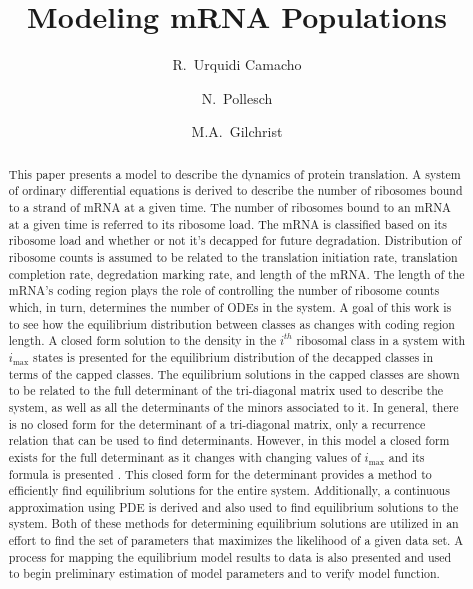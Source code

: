 \documentclass[review]{elsarticle}
\newcommand{\imax}{\ensuremath{i_{\max}}\xspace}
\begin{document}
\title{Modeling mRNA Populations}
\author[utkgst]{R.~Urquidi Camacho}
\author[utkm,curradd]{N.~Pollesch}
\author[utkgst,utkeeb,nimbios,cor1]{M.A.~Gilchrist}
\address[utkgst]{Genome Science and Technology Program, University of Tennessee, Knoxville, TN 37996-XXX}
\address[utkm]{Department of Mathematics, University of Tennessee,  Knoxville, TN 37996-1320}
\address[utkeeb]{Department of Ecology and Evolutionary Biology, University of Tennessee, Knoxville, TN 37996-1610}
\address[nimbios]{National Institute for Mathematical and Biological Synthesis, University of Tennessee, Knoxville, TN 37996-3410}

\begin{abstract}
This paper presents a model to describe the dynamics of protein translation.  
A system of ordinary differential equations is derived to describe the number of ribosomes bound to a strand of mRNA at a given time.
The number of ribosomes bound to an mRNA at a given time is referred to its ribosome load.
The mRNA is classified based on its ribosome load and whether or not it's decapped for future degradation.  
Distribution of ribosome counts is assumed to be related to the translation initiation rate, translation completion rate, degredation marking rate, and length of the mRNA.
The length of the mRNA's coding region plays the role of controlling the number of ribosome counts which, in turn, determines the number of ODEs in the system.  
A goal of this work is to see how the equilibrium distribution between classes as changes with coding region length.
A closed form solution to the density in the $i^{th}$ ribosomal class in a system with \imax states is presented for the equilibrium distribution of the decapped classes in terms of the capped classes.
The equilibrium solutions in the capped classes are shown to be related to the full determinant of the tri-diagonal matrix used to describe the system, as well as all the determinants of the minors associated to it.
In general, there is no closed form for the determinant of a tri-diagonal matrix, only a recurrence relation that can be used to find determinants.
However, in this model a closed form exists for the full determinant as it changes with changing values of \imax and its formula is presented .
This closed form for the determinant provides a method to efficiently find equilibrium solutions for the entire system.
Additionally, a continuous approximation using PDE is derived and also used to find equilibrium solutions to the system.
Both of these methods for determining equilibrium solutions are utilized in an effort to find the set of parameters that maximizes the likelihood of a given data set.
A process for mapping the equilibrium model results to data is also presented and used to begin preliminary estimation of model parameters and to verify model function.
 

\end{abstract}
\end{document}
